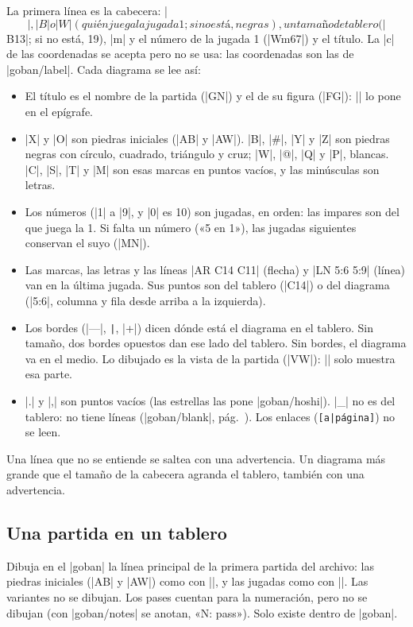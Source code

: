 La primera línea es la cabecera: |$$|, |B| o |W| (quién juega la jugada 1; si no está, negras), un tamaño de tablero (|$$B13|; si no está, 19), |m| y el número de la jugada 1 (|$$Wm67|) y el título. La |c| de las coordenadas se acepta pero no se usa: las coordenadas son las de |goban/label|. Cada diagrama se lee así:
\begin{itemize}
	\item El título es el nombre de la partida (|GN|) y el de su figura (|FG|): |\sgfdiagrams| lo pone en el epígrafe.
	\item |X| y |O| son piedras iniciales (|AB| y |AW|). |B|, |#|, |Y| y |Z| son piedras negras con círculo, cuadrado, triángulo y cruz; |W|, |@|, |Q| y |P|, blancas. |C|, |S|, |T| y |M| son esas marcas en puntos vacíos, y las minúsculas son letras.
	\item Los números (|1| a |9|, y |0| es 10) son jugadas, en orden: las impares son del que juega la 1. Si falta un número («5 en 1»), las jugadas siguientes conservan el suyo (|MN|).
	\item Las marcas, las letras y las líneas |{AR C14 C11}| (flecha) y |{LN 5:6 5:9}| (línea) van en la última jugada. Sus puntos son del tablero (|C14|) o del diagrama (|5:6|, columna y fila desde arriba a la izquierda).
	\item Los bordes (|---|, \verb+|+, |+|) dicen dónde está el diagrama en el tablero. Sin tamaño, dos bordes opuestos dan ese lado del tablero. Sin bordes, el diagrama va en el medio. Lo dibujado es la vista de la partida (|VW|): |\sgfdiagrams| solo muestra esa parte.
	\item |.| y |,| son puntos vacíos (las estrellas las pone |goban/hoshi|). |_| no es del tablero: no tiene líneas (|goban/blank|, pág.~\pageref{subsec:parcial}). Los enlaces (\verb+[a|página]+) no se leen.
\end{itemize}

Una línea que no se entiende se saltea con una advertencia. Un diagrama más grande que el tamaño de la cabecera agranda el tablero, también con una advertencia.

\subsection{Una partida en un tablero}
\label{subsec:sgftablero}

\begin{command}{\sgf{}}

	Dibuja en el |goban| la línea principal de la primera partida del archivo: las piedras iniciales (|AB| y |AW|) como con |\stones|, y las jugadas como con |\moves|. Las variantes no se dibujan. Los pases cuentan para la numeración, pero no se dibujan (con |goban/notes| se anotan, «N: pass»). Solo existe dentro de |goban|.
\end{command}

